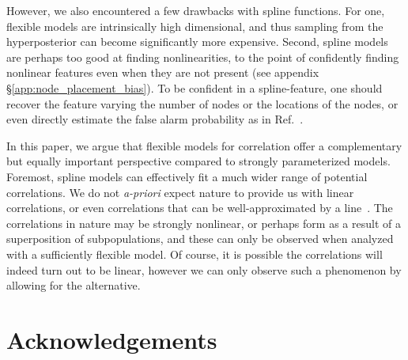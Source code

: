 \begin{refsection}
However, we also encountered a few drawbacks with spline functions. For one, flexible models are intrinsically high dimensional, and thus sampling from the hyperposterior can become significantly more expensive. Second, spline models are perhaps too good at finding nonlinearities, to the point of confidently finding nonlinear features even when they are not present (see appendix \S \ref{app:node_placement_bias}). To be confident in a spline-feature, one should recover the feature varying the number of nodes or the locations of the nodes, or even directly estimate the false alarm probability as in Ref.~\cite{Farah:2023vsc}.

In this paper, we argue that flexible models for correlation offer a complementary but equally important perspective compared to strongly parameterized models. Foremost, spline models can effectively fit a much wider range of potential correlations. We do not \textit{a-priori} expect nature to provide us with linear correlations, or even correlations that can be well-approximated by a line~\cite[e.g.,][]{Belczynski:2017gds, PortegiesZwart:2002iks, Rodriguez:2015oxa, Gerosa:2021mno}.  The correlations in nature may be strongly nonlinear, or perhaps form as a result of a superposition of subpopulations, and these can only be observed when analyzed with a sufficiently flexible model. Of course, it is possible the correlations will indeed turn out to be linear, however we can only observe such a phenomenon by allowing for the alternative.







\section{Acknowledgements}


\end{refsection}

